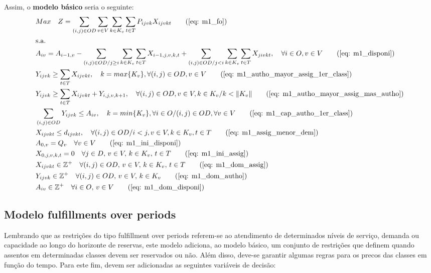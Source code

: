 Assim, o \textbf{modelo básico} seria o seguinte:
\allowdisplaybreaks
\begin{align}
	& Max \quad Z = \sum_{(i,j)\in OD} \sum_{v\in V} \sum_{k\in K_v} \sum_{t\in T} P_{ijvk} X_{ijvkt}     \tag{\ref{eq: m1_fo}}   \\
	& \text{s.a.}  \notag \\
	& A_{iv} = A_{i-1,v} - \sum_{(i,j) \in OD/j \geq i} \sum_{k\in K_v}\sum_{t\in T}X_{i-1,j,v,k,t} + \sum_{(i,j) \in OD/j<i} \sum_{k\in K_v}\sum_{t\in T}X_{jivkt}, \quad \forall i \in O, v \in V   \tag{\ref{eq: m1_disponi}} \\
	& Y_{ijvk} \geq  \sum_{t \in T} X_{ijvkt},  \quad k = max\{K_v\}, \forall(i,j) \in OD ,v \in V     \tag{\ref{eq: m1_autho_mayor_assig_1er_class}} \\
	& Y_{ijvk} \geq  \sum_{t \in T} X_{ijvkt} + Y_{i,j,v,k + 1} , \quad \forall(i,j) \in OD, v \in V, k \in K_v / k < \lVert K_v \rVert   \tag{\ref{eq: m1_autho_mayor_assig_mas_autho}} \\
	& \sum_{(i,j) \in OD} Y_{ijvk} \leq A_{iv}, \quad  k = min\{K_v\}, \forall i \in O / (i,j) \in OD,   \forall v \in V       \tag{\ref{eq: m1_cap_autho_1er_class}} \\
	& X_{ijvkt} \leq d_{ijvkt},  \quad \forall (i,j) \in OD / i < j  ,v \in V, k \in K_v, t\in T   \tag{\ref{eq: m1_assig_menor_dem}} \\
	& A_{0,v} = Q_v \quad \forall v \in V  \tag{\ref{eq: m1_ini_disponi}} \\ 
	& X_{0,j,v,k,t} = 0 \quad \forall j \in D,\, v \in V,\, k \in K_v,\, t \in T  \tag{\ref{eq: m1_ini_assig}} \\ 
	& X_{ijvkt} \in \mathbb{Z}^+ \quad \forall(i,j) \in OD,\, v \in V,\, k \in K_v,\, t \in T  \tag{\ref{eq: m1_dom_assig}} \\ 
	& Y_{ijvk} \in \mathbb{Z}^+ \quad \forall(i,j) \in OD,\, v \in V,\, k \in K_v  \tag{\ref{eq: m1_dom_autho}} \\ 
	& A_{iv} \in \mathbb{Z}^+ \quad \forall i \in O,\, v \in V  \tag{\ref{eq: m1_dom_disponi}} 
\end{align}

\subsection{Modelo fulfillments over periods}
Lembrando que as restrições do tipo fulfillment over periods referem-se ao atendimento de determinados níveis de serviço, demanda ou capacidade ao longo do horizonte de reservas, este modelo adiciona, ao modelo básico, um conjunto de restrições que definem quando assentos em determinadas classes devem ser reservados ou não. Além disso, 
deve-se garantir algumas regras para os precos das classes em função do tempo. Para este fim, devem ser adicionadas as seguintes variáveis de decisão:

